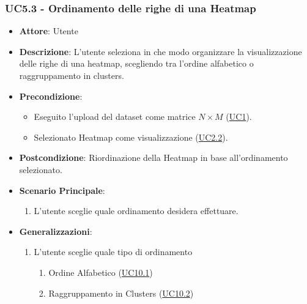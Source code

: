     \subsubsection{UC5.3 - Ordinamento delle righe di una Heatmap}
    \label{uc5.3}
    \begin{itemize}
    \item \textbf{Attore}: Utente
    \item \textbf{Descrizione}: L'utente seleziona in che modo organizzare la visualizzazione delle righe di una heatmap, scegliendo tra l'ordine alfabetico o raggruppamento in clusters.
    \item \textbf{Precondizione}: 
    \begin{itemize}
        \item Eseguito l'upload del dataset come matrice $N\times M$ (\hyperref[uc1]{UC1}).
        \item Selezionato Heatmap come visualizzazione (\hyperref[uc2.2]{UC2.2}).
    \end{itemize}  
    \item \textbf{Postcondizione}: Riordinazione della Heatmap in base all'ordinamento selezionato.
    \item \textbf{Scenario Principale}: 
    \begin{enumerate}
        \item L'utente sceglie quale ordinamento desidera effettuare.
    \end{enumerate}  
    \item \textbf{Generalizzazioni}: 
     \begin{enumerate}
            \item L'utente sceglie quale tipo di ordinamento
                \begin{enumerate}
                    \item Ordine Alfabetico (\hyperref[uc10.1]{UC10.1})
                    \item Raggruppamento in Clusters (\hyperref[uc10.2]{UC10.2})
                    \end{enumerate}
        \end{enumerate} 
    \end{itemize}
    
